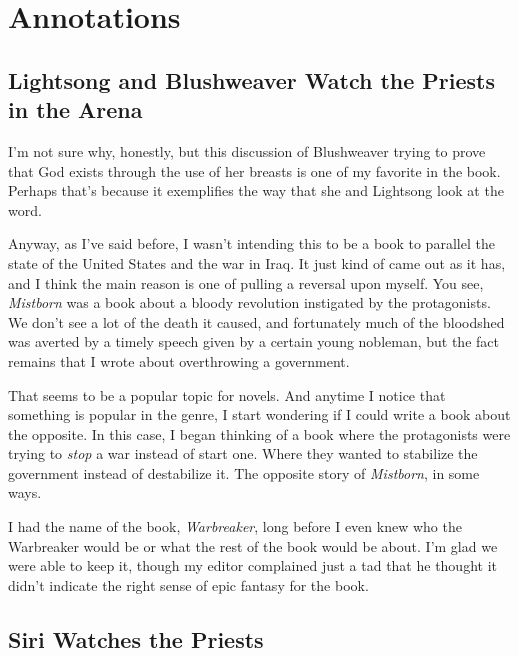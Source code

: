 \section*{Annotations}

\subsection*{Lightsong and Blushweaver Watch the Priests in the Arena}

I’m not sure why, honestly, but this discussion of Blushweaver trying to prove that God exists through the use of her breasts is one of my favorite in the book. Perhaps that’s because it exemplifies the way that she and Lightsong look at the word.

Anyway, as I’ve said before, I wasn’t intending this to be a book to parallel the state of the United States and the war in Iraq. It just kind of came out as it has, and I think the main reason is one of pulling a reversal upon myself. You see, \textit{Mistborn} was a book about a bloody revolution instigated by the protagonists. We don’t see a lot of the death it caused, and fortunately much of the bloodshed was averted by a timely speech given by a certain young nobleman, but the fact remains that I wrote about overthrowing a government.

That seems to be a popular topic for novels. And anytime I notice that something is popular in the genre, I start wondering if I could write a book about the opposite. In this case, I began thinking of a book where the protagonists were trying to \textit{stop} a war instead of start one. Where they wanted to stabilize the government instead of destabilize it. The opposite story of \textit{Mistborn}, in some ways.

I had the name of the book, \textit{Warbreaker}, long before I even knew who the Warbreaker would be or what the rest of the book would be about. I’m glad we were able to keep it, though my editor complained just a tad that he thought it didn’t indicate the right sense of epic fantasy for the book.

\subsection*{Siri Watches the Priests}

